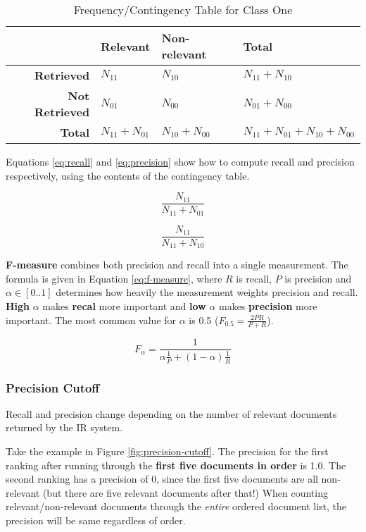 \documentclass{article}
\begin{document}
\begin{table}[H]
	\centering
	\begin{tabular}{|r|l|l|l|}
		\hline
		& \textbf{Relevant} & \textbf{Non-relevant} & \textbf{Total} \\
		\hline
		\textbf{Retrieved} & $N_{11}$ & $N_{10}$ & $N_{11} + N_{10}$ \\
		\textbf{Not Retrieved} & $N_{01}$ & $N_{00}$ & $N_{01} + N_{00}$ \\
		\hline
		\textbf{Total} & $N_{11} + N_{01}$ & $N_{10} + N_{00}$  & $N_{11} + N_{01} + N_{10} + N_{00}$ \\
		\hline
	\end{tabular}
	\caption{Frequency/Contingency Table for Class One}
	\label{tab:example-contingency}
\end{table}

Equations \ref{eq:recall} and \ref{eq:precision} show how to compute recall and precision respectively, using the contents of the contingency table.

\begin{equation}
	\frac{N_{11}}{N_{11} + N_{01}}
	\label{eq:recall}
\end{equation}

\begin{equation}
	\frac{N_{11}}{N_{11} + N_{10}}
	\label{eq:precision}
\end{equation}

\textbf{F-measure} combines both precision and recall into a single measurement. The formula is given in Equation \ref{eq:f-measure}, where $R$ is recall, $P$ is precision and $\alpha \in [0..1]$ determines how heavily the measurement weights precision and recall. \textbf{High} $\alpha$ makes \textbf{recal}  more important and \textbf{low} $\alpha$ makes \textbf{precision} more important. The most common value for $\alpha$ is 0.5 ($F_{0.5} = \frac{2PR}{P + R}$).

\begin{equation}
	F_{\alpha} = \frac{1}{\alpha \frac{1}{P} + (1-\alpha)\frac{1}{R}}
	\label{eq:f-measure}
\end{equation}

\subsubsection{Precision Cutoff}

Recall and precision change depending on the number of relevant documents returned by the IR system.

Take the example in Figure \ref{fig:precision-cutoff}. The precision for the first ranking after running through the \textbf{first five documents in order} is 1.0. The second ranking has a precision of 0, since the first five documents are all non-relevant (but there are five relevant documents after that!) When counting relevant/non-relevant documents through the \textit{entire} ordered document list, the precision will be same regardless of order.
\end{document}
